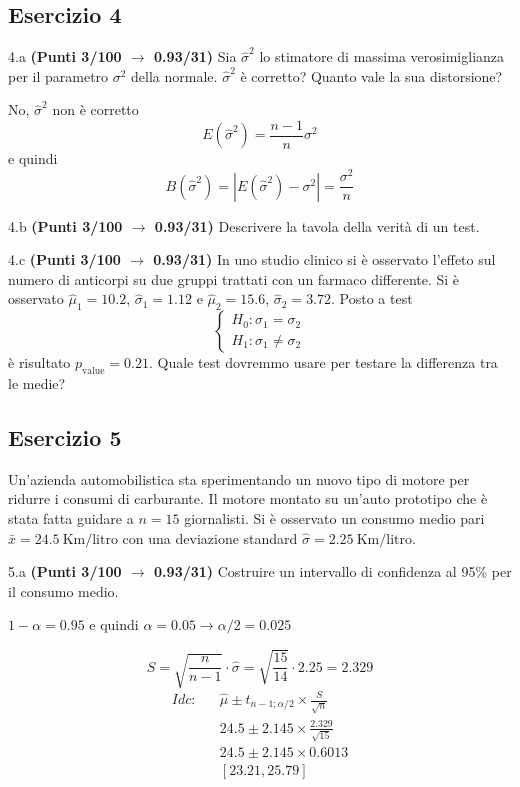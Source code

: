 \documentclass[
  11pt,
]{book}
\theoremstyle{mytheoremstyle}
\theoremstyle{mydefstyle}
\newenvironment{sol}
  {
  \begin{tcolorbox}[enhanced,breakable,arc=0.1mm,boxrule=1pt,colback=white,colframe=iblue,
  title=\bf \fontfamily{lmss}\selectfont \hspace{.5 cm} Soluzione,drop fuzzy shadow]

}{
\end{tcolorbox}
  }
\begin{document}
\subsection{Esercizio 4}\label{esercizio-4-7}

4.a \textbf{(Punti 3/100 \(\rightarrow\) 0.93/31)} Sia \(\hat\sigma^2\) lo stimatore di massima verosimiglianza per il parametro \(\sigma^2\) della normale. \(\hat\sigma^2\) è corretto? Quanto vale la sua distorsione?

\begin{sol}
No, \(\hat\sigma^2\) non è corretto
\[
E(\hat\sigma^2)=\frac{n-1}n\sigma^2
\]
e quindi
\[
B(\hat\sigma^2)=|E(\hat\sigma^2)-\sigma^2|=\frac {\sigma^2}n
\]

\end{sol}

4.b \textbf{(Punti 3/100 \(\rightarrow\) 0.93/31)} Descrivere la tavola della verità di un test.

4.c \textbf{(Punti 3/100 \(\rightarrow\) 0.93/31)} In uno studio clinico si è osservato l'effeto sul numero di anticorpi su due gruppi trattati con un farmaco differente. Si è osservato \(\hat\mu_1=10.2\), \(\hat\sigma_1=1.12\) e \(\hat\mu_2=15.6\), \(\hat\sigma_2=3.72\). Posto a test
\[
\begin{cases}
H_0:\sigma_1=\sigma_2\\
H_1:\sigma_1\ne \sigma_2
\end{cases}
\]
è risultato \(p_\text{value}=0.21\). Quale test dovremmo usare per testare la differenza tra le medie?

\subsection{Esercizio 5}\label{esercizio-5-6}

Un'azienda automobilistica sta sperimentando un nuovo tipo di motore per ridurre i consumi di carburante. Il motore montato su un'auto prototipo che è stata fatta guidare a \(n=15\) giornalisti. Si è osservato un consumo medio pari \(\bar x=24.5~\text{Km/litro}\) con una deviazione standard \(\hat\sigma=2.25~\text{Km/litro}\).

5.a \textbf{(Punti 3/100 \(\rightarrow\) 0.93/31)} Costruire un intervallo di confidenza al 95\% per il consumo medio.

\begin{sol}
\(1-\alpha =0.95\) e quindi \(\alpha=0.05\rightarrow \alpha/2=0.025\)

\[
      S  =\sqrt{\frac {n}{n-1}}\cdot\hat\sigma =
     \sqrt{\frac { 15 }{ 14 }}\cdot 2.25 = 2.329 
\]
\begin{eqnarray*}
  Idc: & &  \hat\mu \pm  t_{n-1;\alpha/2} \times \frac{S}{\sqrt{n}} \\
     & &  24.5 \pm  2.145 \times \frac{ 2.329 }{\sqrt{ 15 }} \\
     & &  24.5 \pm  2.145 \times  0.6013 \\
     & & [ 23.21 ,  25.79 ]
\end{eqnarray*}

\end{sol}
\end{document}
